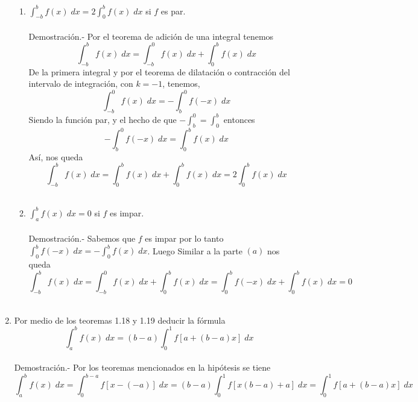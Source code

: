 \begin{enumerate}
\begin{enumerate}[\bfseries (a)]
	    \item $\displaystyle\int_{-b}^b f(x)\; dx = 2\int_0^b f(x)\; dx$ si $f$ es par.\\\\
		Demostración.-\; Por el teorema de adición de una integral tenemos $$\int_{-b}^b f(x) \; dx = \int_{-b}^0 f(x) \; dx + \int_0^b f(x) \; dx$$
		De la primera integral y por el teorema de dilatación o contracción del intervalo de integración, con $k=-1$, tenemos, $$\int_{-b}^0 f(x) \; dx = -\int_b^0 f(-x)\; dx$$ 
		Siendo la función par, y el hecho de que $-\int_b^0 = \int_0^b$ entonces  $$-\displaystyle\int_{b}^0 f(-x)\; dx = \int_0^b f(x) \; dx$$
		Así, nos queda $$\int_{-b}^b f(x) \; dx = \int_0^b f(x) \; dx + \int_0^b f(x) \; dx = 2\int_0^b f(x) \; dx$$\\

	    \item $\displaystyle\int_a^b f(x) \; dx = 0$ si $f$ es impar.\\\\
		Demostración.-\; Sabemos que $f$ es impar por lo tanto $\displaystyle\int_0^b f(-x)\; dx = -\int_0^b f(x) \; dx$. Luego Similar a la parte $(a)$ nos queda  
		$$\int_{-b}^b f(x)\; dx = \int_{-b}^0 f(x) \; dx + \int_0^b f(x) \;dx = \int_0^b f(-x)\; dx + \int_0^b f(x) \; dx = 0$$\\

	\end{enumerate}

    \item Por medio de los teoremas 1.18 y 1.19 deducir la fórmula $$\int_a^b f(x) \; dx = (b-a)\int_0^1 f[a+(b-a)x] \; dx$$\\
	Demostración.-\; Por los teoremas mencionados en la hipótesis se tiene $$\int_a^b f(x) \; dx = \int_0^{b-a} f[x-(-a)] \; dx = (b-a) \int_0^1 f[x(b-a)+a] \; dx = \int_0^1 f[a+(b-a)x] \; dx$$\\ 


\end{enumerate}
